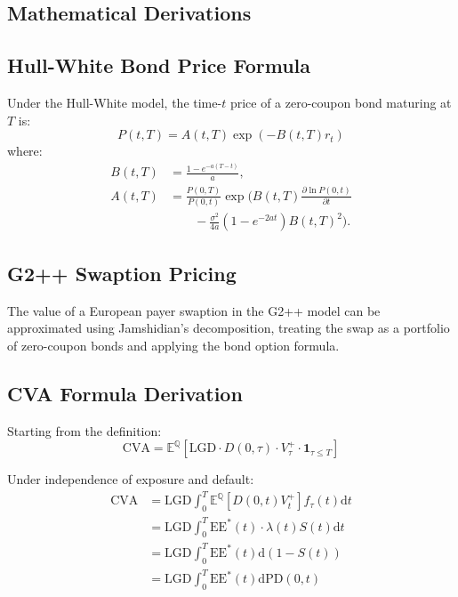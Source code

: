 \documentclass[conference]{IEEEtran}
\theoremstyle{definition}
\newcommand{\E}{\mathbb{E}}
\newcommand{\Q}{\mathbb{Q}}
\newcommand{\ind}{\mathbf{1}}
\newcommand{\diff}{\mathrm{d}}
\newcommand{\LGD}{\mathrm{LGD}}
\newcommand{\PD}{\mathrm{PD}}
\newcommand{\EE}{\mathrm{EE}}
\newcommand{\CVA}{\mathrm{CVA}}
\begin{document}
\begin{appendices}

\section{Mathematical Derivations}

\subsection{Hull-White Bond Price Formula}

Under the Hull-White model, the time-$t$ price of a zero-coupon bond maturing at $T$ is:
\begin{equation}
P(t,T) = A(t,T) \exp(-B(t,T) r_t)
\end{equation}
where:
\begin{align}
B(t,T) &= \frac{1 - e^{-a(T-t)}}{a}, \\
A(t,T) &= \frac{P(0,T)}{P(0,t)} \exp\biggl(
 B(t,T) \frac{\partial \ln P(0,t)}{\partial t} \nonumber\\
&\qquad - \frac{\sigma^2}{4a}(1-e^{-2at})B(t,T)^2 \biggr).
\end{align}

\subsection{G2++ Swaption Pricing}

The value of a European payer swaption in the G2++ model can be approximated using Jamshidian's decomposition, treating the swap as a portfolio of zero-coupon bonds and applying the bond option formula.

\subsection{CVA Formula Derivation}

Starting from the definition:
\begin{equation}
\CVA = \E^{\Q}\left[ \LGD \cdot D(0,\tau) \cdot V_\tau^+ \cdot \ind_{\tau \leq T} \right]
\end{equation}

Under independence of exposure and default:
\begin{align}
\CVA &= \LGD \int_0^T \E^{\Q}\left[ D(0,t) V_t^+ \right] f_\tau(t) \diff t \\
&= \LGD \int_0^T \EE^*(t) \cdot \lambda(t) S(t) \diff t \\
&= \LGD \int_0^T \EE^*(t) \diff(1 - S(t)) \\
&= \LGD \int_0^T \EE^*(t) \diff \PD(0,t)
\end{align}


\end{appendices}
\end{document}

